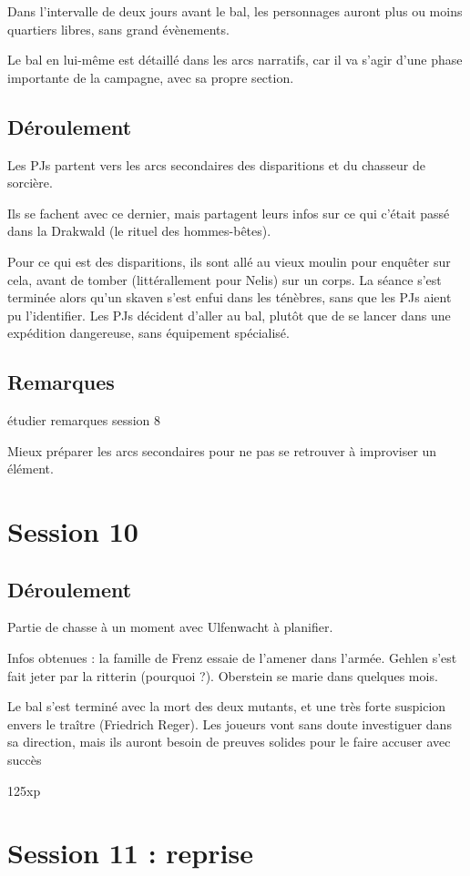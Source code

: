 \documentclass[10pt,a4paper]{book}
\begin{document}
Dans l'intervalle de deux jours avant le bal, les personnages auront plus ou moins quartiers libres, sans grand évènements.

Le bal en lui-même est détaillé dans les arcs narratifs, car il va s'agir d'une phase importante de la campagne, avec sa propre section.
\subsection{Déroulement}
Les PJs partent vers les arcs secondaires des disparitions et du chasseur de sorcière.

Ils se fachent avec ce dernier, mais partagent leurs infos sur ce qui c'était passé dans la Drakwald (le rituel des hommes-bêtes). 

Pour ce qui est des disparitions, ils sont allé au vieux moulin pour enquêter sur cela, avant de tomber (littérallement pour Nelis) sur un corps. La séance s'est terminée alors qu'un skaven s'est enfui dans les ténèbres, sans que les PJs aient pu l'identifier. Les PJs décident d'aller au bal, plutôt que de se lancer dans une expédition dangereuse, sans équipement spécialisé.
\subsection{Remarques}
étudier remarques session 8

Mieux préparer les arcs secondaires pour ne pas se retrouver à improviser un élément.
\section{Session 10}
\subsection{Déroulement}
Partie de chasse à un moment avec Ulfenwacht à planifier.

Infos obtenues : la famille de Frenz essaie de l'amener dans l'armée. Gehlen s'est fait jeter par la ritterin (pourquoi ?). Oberstein se marie dans quelques mois.

Le bal s'est terminé avec la mort des deux mutants, et une très forte suspicion envers le traître (Friedrich Reger). Les joueurs vont sans doute investiguer dans sa direction, mais ils auront besoin de preuves solides pour le faire accuser avec succès

125xp
\section{Session 11 : reprise}
\end{document}
